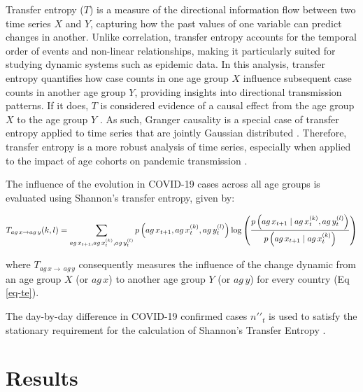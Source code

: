 \documentclass[Harvard,Times1COL]{WileyNJDv5}
\begin{document}
{Transfer entropy (\(T\)) is a measure of the directional information
flow between two time series \(X\) and \(Y\), capturing how the past
values of one variable can predict changes in another. Unlike
correlation, transfer entropy accounts for the temporal order of events
and non-linear relationships, making it particularly suited for studying
dynamic systems such as epidemic data. In this analysis, transfer
entropy quantifies how case counts in one age group \(X\) influence
subsequent case counts in another age group \(Y\), providing insights
into directional transmission patterns. If it does, \(T\) is considered
evidence of a causal effect from the age group \(X\) to the age group
\(Y\) \citep{schreiber2000measuring}. As such, Granger causality is a
special case of transfer entropy applied to time series that are jointly
Gaussian distributed \citep{barnett2009granger}. Therefore, transfer
entropy is a more robust analysis of time series, especially when
applied to the impact of age cohorts on pandemic transmission
\citep{kissler2020symbolic}.

The influence of the evolution in COVID-19 cases across all age groups
is evaluated using Shannon's transfer entropy, given by:

\begin{equation}\label{eq-te}{
\begin{aligned}[t]
  T_{ag\,x \rightarrow ag\,y}(k,l) = \sum_{ag\,x_{t+1}, ag\,x_t^{(k)}, ag\,y_t^{(l)}} 
  p\left(ag\,x_{t+1}, ag\,x_t^{(k)}, ag\,y_t^{(l)}\right) 
  \log \left(\frac{p\left(ag\,x_{t+1} \mid ag\,x_t^{(k)}, ag\,y_t^{(l)}\right)}{p\left(ag\,x_{t+1} \mid ag\,x_t^{(k)}\right)}\right)
\end{aligned}
}\end{equation}

\noindent where \(T_{ag\,x \rightarrow\,ag\,y}\) consequently measures
the influence of the change dynamic from an age group \(X\) (or
\(ag\,x\)) to another age group \(Y\) (or \(ag\,y\)) for every country
(Eq \ref{eq-te}).

The day-by-day difference in COVID-19 confirmed cases
\(n\prime\prime_t\) is used to satisfy the stationary requirement for
the calculation of Shannon's Transfer Entropy
\citep{shannon1948mathematical, behrendt2019rtransferentropy}.

\section{Results}\label{results}

}
\end{document}
